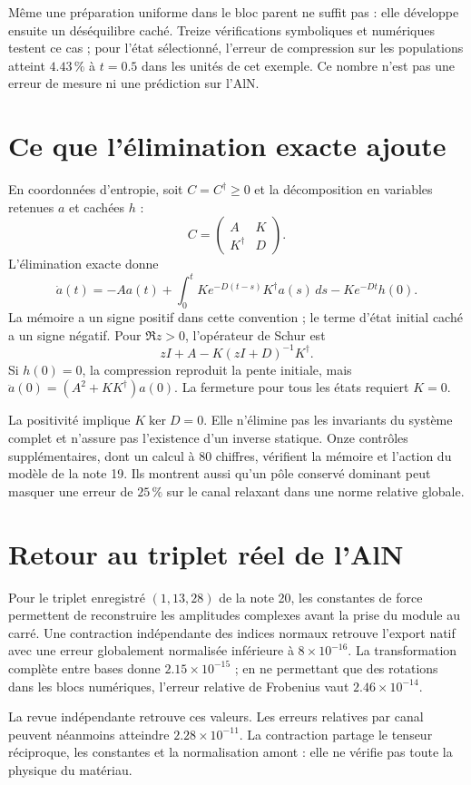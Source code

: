 \documentclass[11pt,a4paper]{article}
\begin{document}
Même une préparation uniforme dans le bloc parent ne suffit pas :
elle développe ensuite un déséquilibre caché. Treize vérifications
symboliques et numériques testent ce cas ; pour l'état sélectionné,
l'erreur de compression sur les populations atteint $4.43\,\%$ à
$t=0.5$ dans les unités de cet exemple. Ce nombre n'est pas une erreur
de mesure ni une prédiction sur l'AlN.

\section{Ce que l'élimination exacte ajoute}
En coordonnées d'entropie, soit $C=C^\dagger\ge0$ et la décomposition
en variables retenues $a$ et cachées $h$ :
\[
 C=\begin{pmatrix}A&K\\K^\dagger&D\end{pmatrix}.
\]
L'élimination exacte donne
\[
 \dot a(t)=-Aa(t)+\int_0^t
 K e^{-D(t-s)}K^\dagger a(s)\,ds-Ke^{-Dt}h(0).
\]
La mémoire a un signe positif dans cette convention ; le terme
d'état initial caché a un signe négatif.
Pour $\Re z>0$, l'opérateur de Schur est
\[
 zI+A-K(zI+D)^{-1}K^\dagger.
\]
Si $h(0)=0$, la compression reproduit la pente initiale, mais
$\ddot a(0)=(A^2+KK^\dagger)a(0)$. La fermeture pour tous les états
requiert $K=0$.

La positivité implique $K\ker D=0$. Elle n'élimine pas les invariants
du système complet et n'assure pas l'existence d'un inverse statique.
Onze contrôles supplémentaires, dont un calcul à 80 chiffres,
vérifient la mémoire et l'action du modèle de la note 19.
Ils montrent aussi qu'un pôle conservé dominant peut masquer une
erreur de $25\,\%$ sur le canal relaxant dans une norme relative globale.

\section{Retour au triplet réel de l'AlN}
Pour le triplet enregistré $(1,13,28)$ de la note 20, les constantes
de force permettent de reconstruire les amplitudes complexes avant
la prise du module au carré. Une contraction indépendante des indices
normaux retrouve l'export natif avec une erreur globalement normalisée
inférieure à $8\times10^{-16}$.
La transformation complète entre bases donne $2.15\times10^{-15}$ ;
en ne permettant que des rotations dans les blocs numériques,
l'erreur relative de Frobenius vaut $2.46\times10^{-14}$.

La revue indépendante retrouve ces valeurs. Les erreurs relatives par
canal peuvent néanmoins atteindre $2.28\times10^{-11}$.
La contraction partage le tenseur réciproque, les constantes et la
normalisation amont : elle ne vérifie pas toute la physique du matériau.
\end{document}
